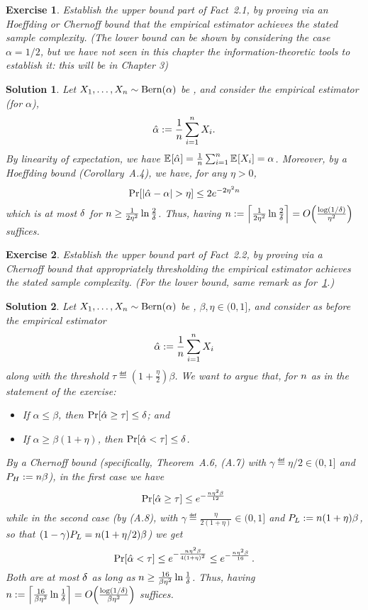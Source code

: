 \documentclass[biber,plain]{nowfnt} %
\newtheorem{question}{Exercise}[chapter]
\newtheorem{solution}{Solution}[chapter]
\begin{document}
\begin{question}\label{ex:uniformity:bias:coin}
  Establish the upper bound part of Fact~2.1, by proving \textit{via} an Hoeffding or Chernoff bound that the empirical estimator achieves the stated sample complexity. (The lower bound can be shown by considering the case $\alpha=1/2$, but we have not seen in this chapter the information-theoretic tools to establish it: this will be in Chapter 3)
\end{question}
\begin{solution}
Let $X_1,\dots, X_n \sim \operatorname{Bern}( \alpha ) $ be \iid, and consider the empirical estimator (for $\alpha$), 
\[
	\hat{\alpha} := \frac{1}{n}\sum_{i=1}^n X_i.
\]
By linearity of expectation, we have $\bEE{\hat{\alpha}} = \frac{1}{\ns}\sum_{i=1}^\ns \bEE{X_i} = \alpha$. Moreover, by a Hoeffding bound (Corollary~A.4), we have, for any $\eta>0$,
\[
	\bPr{\abs{\hat{\alpha} - \alpha}> \eta} \leq 2e^{-2\eta^2 \ns}
\]
which is at most $\delta$ for
 $n \geq \frac{1}{2\eta^2}\ln\frac{2}{\delta}$. Thus, having $\ns \eqdef \clg{\frac{1}{2\eta^2}\ln\frac{2}{\errprob}} = \bigO{\frac{\log(1/\errprob)}{\eta^2}}$ suffices.

\end{solution}
\begin{question}\label{ex:uniformity:bias:coin:testing}
  Establish the upper bound part of Fact~2.2, by proving \textit{via} a Chernoff bound that appropriately thresholding the empirical estimator achieves the stated sample complexity. (For the lower bound, same remark as for~\cref{ex:uniformity:bias:coin}.)
\end{question}
\begin{solution}
Let $X_1,\dots, X_n \sim \operatorname{Bern}( \alpha ) $ be \iid, $\beta,\eta\in(0,1]$, and consider as before the empirical estimator
\[
	\hat{\alpha} := \frac{1}{n}\sum_{i=1}^n X_i
\]
along with the threshold $\tau \eqdef (1+\frac{\eta}{2})\beta$. We want to argue that, for $n$ as in the statement of the exercise:
\begin{itemize}
	\item If $\alpha \leq \beta$, then $\bPr{\hat{\alpha} \geq \tau} \leq \errprob$; and
	\item If $\alpha \geq \beta(1+\eta)$, then $\bPr{\hat{\alpha} < \tau} \leq \errprob$.
\end{itemize}
By a Chernoff bound (specifically, Theorem~A.6, (A.7) with $\gamma \eqdef \eta/2\in(0,1]$ and $P_H := n\beta$), in the first case we have
\[
	\bPr{\hat{\alpha} \geq \tau} \leq e^{-\frac{\ns\eta^2\beta}{12}}\,
\]
while in the second case (by (A.8), with $\gamma \eqdef \frac{\eta}{2(1+\eta)}\in(0,1]$ and $P_L := n(1+\eta)\beta$, so that $(1-\gamma)P_L = n(1+\eta/2)\beta$) we get
\[
	\bPr{\hat{\alpha} < \tau} \leq e^{-\frac{\ns\eta^2\beta}{4(1+\eta)^2}}
	\leq e^{-\frac{\ns\eta^2\beta}{16}}\,.
\]
Both are at most $\delta$ as long as $n \geq \frac{16}{\beta\eta^2}\ln \frac{1}{\delta}$. Thus, having $\ns \eqdef \clg{\frac{16}{\beta\eta^2}\ln\frac{1}{\errprob}} = \bigO{\frac{\log(1/\errprob)}{\beta\eta^2}}$ suffices.
\end{solution}
\end{document}
